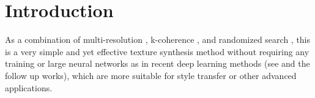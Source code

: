 \section{Introduction}

As a combination of multi-resolution \cite{Wei:2000:FTS}, k-coherence \cite{Tong:2002:SBT}, and randomized search \cite{Barnes:2009:PRC}, this is a very simple and yet effective texture synthesis method without requiring any training or large neural networks as in recent deep learning methods (see \cite{Gatys:2016:IST} and the follow up works), which are more suitable for style transfer or other advanced applications.
